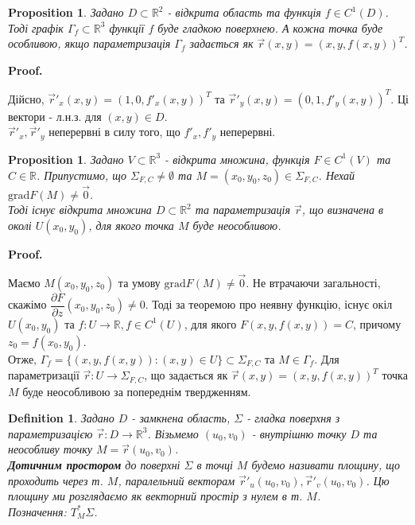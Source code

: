 \documentclass[a4paper, 10pt]{article}
\makeatletter
\def\departial#1#2{\dfrac{\partial {#1}}{\partial {#2}}}
\def\qed{$\blacksquare$}
\theoremstyle{theoremdd}
\theoremstyle{theoremdd}
\newtheorem{definition}[theorem]{Definition}
\theoremstyle{theoremdd}
\theoremstyle{theoremdd}
\theoremstyle{theoremdd}
\newtheorem{proposition}[theorem]{Proposition}
\theoremstyle{theoremdd}
\theoremstyle{theoremdd}
\theoremstyle{theoremdd}
\renewenvironment{proof}[1][Proof.\\]{\par
\pushQED{\hfill \qed}%
\normalfont \topsep6\p@\@plus6\p@\relax
\trivlist
\item\relax
{\bfseries
#1\@addpunct{.}}\hspace\labelsep\ignorespaces
}{%
\popQED\endtrivlist\@endpefalse
}
\makeatother
\begin{document}
\begin{proposition}
Задано $D \subset \mathbb{R}^2$ - відкрита область та функція $f \in C^1(D)$. Тоді графік $\Gamma_f \subset \mathbb{R}^3$ функції $f$ буде гладкою поверхнею. А кожна точка буде особливою, якщо параметризація $\Gamma_f$ задається як $\vec{r}(x,y) = (x,y,f(x,y))^T$.
\end{proposition}

\begin{proof}
Дійсно, $\vec{r}'_x(x,y) = (1,0,f'_x(x,y))^T$ та $\vec{r}'_y(x,y) = (0,1,f'_y(x,y))^T$. Ці вектори - л.н.з. для $(x,y) \in D$.\\
$\vec{r}'_x, \vec{r}'_y$ неперервні в силу того, що $f'_x,f'_y$ неперервні.
\end{proof}

\begin{proposition}
Задано $V \subset \mathbb{R}^3$ - відкрита множина, функція $F \in C^1(V)$ та $C \in \mathbb{R}$. Припустимо, що $\Sigma_{F,C} \neq \emptyset$ та $M =(x_0,y_0,z_0) \in \Sigma_{F,C}$. Нехай $\text{grad} F(M) \neq \vec{0}$. \\
Тоді існує відкрита множина $D \subset \mathbb{R}^2$ та параметризація $\vec{r}$, що визначена в околі $U(x_0,y_0)$, для якого точка $M$ буде неособливою.
\end{proposition}

\begin{proof}
Маємо $M(x_0,y_0,z_0)$ та умову $\text{grad} F(M) \neq \vec{0}$. Не втрачаючи загальності, скажімо $\departial{F}{z}(x_0,y_0,z_0) \neq 0$. Тоді за теоремою про неявну функцію, існує окіл $U(x_0,y_0)$ та $f: U \to \mathbb{R}, f \in C^1(U)$, для якого $F(x,y,f(x,y)) = C$, причому $z_0 = f(x_0,y_0)$.\\
Отже, $\Gamma_f = \{(x,y,f(x,y)) : (x,y) \in U\} \subset \Sigma_{F,C}$ та $M \in \Gamma_f$. Для параметризації $\vec{r}: U \to \Sigma_{F,C}$, що задається як $\vec{r}(x,y) = (x,y,f(x,y))^T$ точка $M$ буде неособливою за попереднім твердженням.
\end{proof}

\begin{definition}
Задано $D$ - замкнена область, $\Sigma$ - гладка поверхня з параметризацією $\vec{r}: D \to \mathbb{R}^3$. Візьмемо $(u_0,v_0)$ - внутрішню точку $D$ та неособливу точку $M = \vec{r}(u_0,v_0)$.\\
\textbf{Дотичним простором} до поверхні $\Sigma$ в точці $M$ будемо називати площину, що проходить через т. $M$, паралельний векторам $\vec{r}'_u(u_0,v_0), \vec{r}'_v(u_0,v_0)$. Цю площину ми розглядаємо як векторний простір з нулем в т. $M$.\\
Позначення: $T^*_M \Sigma$.
\end{definition}
\end{document}
